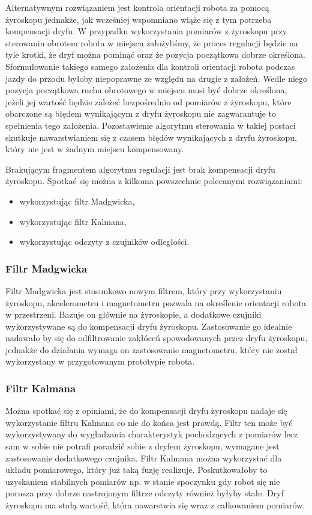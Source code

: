 \documentclass[12pt,a4paper,twoside,openright,fleqn]{mwrep}
\begin{document}
Alternatywnym rozwiązaniem jest kontrola orientacji robota za pomocą żyroskopu jednakże, jak wcześniej wspomniano wiąże się z tym potrzeba kompensacji dryfu. W przypadku wykorzystania pomiarów z żyroskopu przy sterowaniu obrotem robota w miejscu założyliśmy, że proces regulacji będzie na tyle krotki, że dryf można pominąć oraz że pozycja początkowa dobrze określona. Sformułowanie takiego samego założenia dla kontroli orientacji robota podczas jazdy do przodu byłoby niepoprawne ze względu na drugie z założeń. Wedle niego pozycja początkowa ruchu obrotowego w miejscu musi być dobrze określona, jeżeli jej wartość będzie zależeć bezpośrednio od pomiarów z żyroskopu, które obarczone są błędem wynikającym z dryfu żyroskopu nie zagwarantuje to  spełnienia tego założenia. Pozostawienie algorytmu sterowania w takiej postaci skutkuje nawarstwianiem się z czasem błędów wynikających z dryfu żyroskopu, który nie jest w żadnym miejscu kompensowany. 

Brakującym fragmentem algorytmu regulacji jest brak kompensacji dryfu żyroskopu. Spotkać się można z kilkoma powszechnie polecanymi rozwiązaniami:

\begin{itemize}
    \item wykorzystując filtr Madgwicka,
    \item wykorzystując filtr Kalmana,
    \item wykorzystując odczyty z czujników odległości.
\end{itemize}

\subsubsection{Filtr Madgwicka} 
    Filtr Madgwicka jest stosunkowo nowym filtrem, który przy wykorzystaniu żyroskopu, akcelerometru i magnetometru pozwala na określenie orientacji robota w przestrzeni. Bazuje on głównie na żyroskopie, a dodatkowe czujniki wykorzystywane są do kompensacji dryfu żyroskopu. Zastosowanie go idealnie nadawało by się do odfiltrowanie zakłóceń spowodowanych przez dryfu żyroskopu, jednakże do działania wymaga on zastosowanie magnetometru, który nie został wykorzystany w przygotowanym prototypie robota. 

\subsubsection{Filtr Kalmana} 
Można spotkać się z opiniami, że do kompensacji dryfu żyroskopu nadaje się wykorzystanie filtru Kalmana co nie do końca jest prawdą. Filtr ten może być wykorzystywany do wygładzania charakterystyk pochodzących z pomiarów lecz sam w sobie nie potrafi poradzić sobie z dryfem żyroskopu, wymagane jest zastosowanie dodatkowego czujnika. Filtr Kalmana można wykorzystać dla układu pomiarowego, który już taką fuzję realizuje. Poskutkowałoby to uzyskaniem stabilnych pomiarów np. w stanie spoczynku gdy robot się nie porusza przy dobrze nastrojonym filtrze odczyty również byłyby stałe. Dryf żyroskopu ma stałą wartość, która nawarstwia się wraz z całkowaniem pomiarów. 
\end{document}
